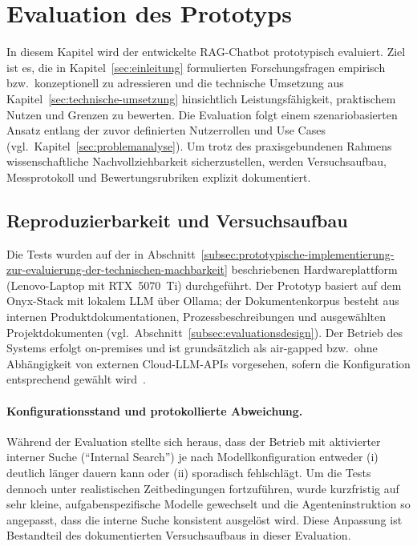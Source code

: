 \newpage
\section{Evaluation des Prototyps}\label{sec:evaluation}

In diesem Kapitel wird der entwickelte RAG-Chatbot prototypisch evaluiert.
Ziel ist es, die in Kapitel~\ref{sec:einleitung} formulierten Forschungsfragen empirisch bzw.\ konzeptionell zu adressieren und die technische Umsetzung aus Kapitel~\ref{sec:technische-umsetzung} hinsichtlich Leistungsfähigkeit, praktischem Nutzen und Grenzen zu bewerten.
Die Evaluation folgt einem szenariobasierten Ansatz entlang der zuvor definierten Nutzerrollen und Use Cases (vgl.\ Kapitel~\ref{sec:problemanalyse}).
Um trotz des praxisgebundenen Rahmens wissenschaftliche Nachvollziehbarkeit sicherzustellen, werden Versuchsaufbau, Messprotokoll und Bewertungsrubriken explizit dokumentiert.

\subsection{Reproduzierbarkeit und Versuchsaufbau}\label{subsec:eval-reproduzierbarkeit}

Die Tests wurden auf der in Abschnitt~\ref{subsec:prototypische-implementierung-zur-evaluierung-der-technischen-machbarkeit} beschriebenen Hardwareplattform (Lenovo-Laptop mit RTX~5070~Ti) durchgeführt.
Der Prototyp basiert auf dem Onyx-Stack mit lokalem LLM über Ollama; der Dokumentenkorpus besteht aus internen Produktdokumentationen, Prozessbeschreibungen und ausgewählten Projektdokumenten (vgl.\ Abschnitt~\ref{subsec:evaluationsdesign}).
Der Betrieb des Systems erfolgt on-premises und ist grundsätzlich als air-gapped bzw.\ ohne Abhängigkeit von externen Cloud-LLM-APIs vorgesehen, sofern die Konfiguration entsprechend gewählt wird~\cite{onyx_github}.

\paragraph{Konfigurationsstand und protokollierte Abweichung.}
Während der Evaluation stellte sich heraus, dass der Betrieb mit aktivierter interner Suche (\enquote{Internal Search}) je nach Modellkonfiguration entweder (i) deutlich länger dauern kann oder (ii) sporadisch fehlschlägt.
Um die Tests dennoch unter realistischen Zeitbedingungen fortzuführen, wurde kurzfristig auf sehr kleine, aufgabenspezifische Modelle gewechselt und die Agenteninstruktion so angepasst, dass die interne Suche konsistent ausgelöst wird.
Diese Anpassung ist Bestandteil des dokumentierten Versuchsaufbaus in dieser Evaluation.


